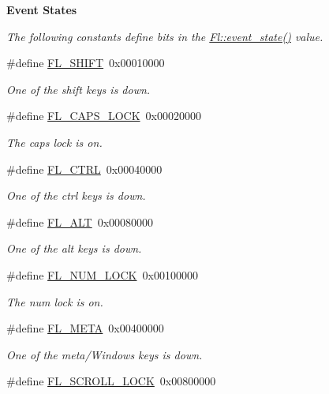 \begin{Indent}\textbf{ Event States}\par
{\em The following constants define bits in the \hyperlink{group__fl__events_gafa17a5b4d8d9163631c88142e60447ed}{Fl\+::event\+\_\+state()} value. }\begin{DoxyCompactItemize}
\item 
\#define \hyperlink{_enumerations_8_h_aa0d93ca1bc8a0c7f84888cdf458f043d}{F\+L\+\_\+\+S\+H\+I\+FT}~0x00010000
\begin{DoxyCompactList}\small\item\em One of the shift keys is down. \end{DoxyCompactList}\item 
\#define \hyperlink{_enumerations_8_h_add5e55eea768b7bbc0cd25a2455811f0}{F\+L\+\_\+\+C\+A\+P\+S\+\_\+\+L\+O\+CK}~0x00020000
\begin{DoxyCompactList}\small\item\em The caps lock is on. \end{DoxyCompactList}\item 
\#define \hyperlink{_enumerations_8_h_a29324ec5ac8c1d87950127d387dc83e8}{F\+L\+\_\+\+C\+T\+RL}~0x00040000
\begin{DoxyCompactList}\small\item\em One of the ctrl keys is down. \end{DoxyCompactList}\item 
\#define \hyperlink{_enumerations_8_h_a58b1ac5446b292c77043f99558eb07cb}{F\+L\+\_\+\+A\+LT}~0x00080000
\begin{DoxyCompactList}\small\item\em One of the alt keys is down. \end{DoxyCompactList}\item 
\#define \hyperlink{_enumerations_8_h_af4708895fdb16d3982408fee68ba502b}{F\+L\+\_\+\+N\+U\+M\+\_\+\+L\+O\+CK}~0x00100000
\begin{DoxyCompactList}\small\item\em The num lock is on. \end{DoxyCompactList}\item 
\#define \hyperlink{_enumerations_8_h_a2c50b1b00111f992d5d49f07c9cee22a}{F\+L\+\_\+\+M\+E\+TA}~0x00400000
\begin{DoxyCompactList}\small\item\em One of the meta/\+Windows keys is down. \end{DoxyCompactList}\item 
\#define \hyperlink{_enumerations_8_h_aca94eaafd01b36904a24522c2b2a320a}{F\+L\+\_\+\+S\+C\+R\+O\+L\+L\+\_\+\+L\+O\+CK}~0x00800000

\end{DoxyCompactItemize}
\end{Indent}
